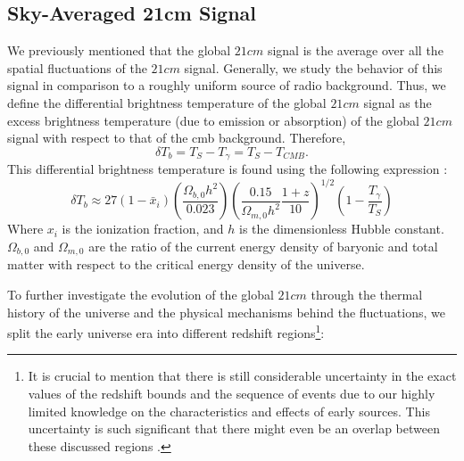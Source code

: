 \documentclass[12pt, TexShade, letterpaper]{report}
\begin{document}
\subsection{Sky-Averaged 21cm Signal}
\label{chap:global21cm,sub:physics,sub:global}
We previously mentioned that the global $21cm$ signal is the average over all the spatial fluctuations of the $21cm$ signal. Generally, we study the behavior of this signal in comparison to a roughly uniform source of radio background. Thus, we define the differential brightness temperature of the global $21cm$ signal as the excess brightness temperature (due to emission or absorption) of the global $21cm$ signal with respect to that of the \gls{cmb} background. Therefore,
\begin{equation}
    \delta T_b = T_{S} - T_{\gamma} = T_S - T_{CMB}.
\end{equation}
This differential brightness temperature is found using the following expression \cite{low_frequency}:
\begin{equation}
    \delta T_b \approx 27 \left(1- \bar{x}_i\right) \left(\frac{\Omega_{b, 0}h^2}{0.023}\right) \left( \frac{0.15}{\Omega_{m, 0}h^2} \frac{1+z}{10}\right)^{1/2}\left(1-\frac{T_\gamma}{T_S}\right)
    \label{eq:global_curve}
\end{equation}
Where $x_i$ is the ionization fraction, and $h$ is the dimensionless Hubble constant. $\Omega_{b, 0}$ and $\Omega_{m, 0}$ are the ratio of the current energy density of baryonic and total matter with respect to the critical energy density of the universe.\par
To further investigate the evolution of the global $21cm$ through the thermal history of the universe and the physical mechanisms behind the fluctuations, we split the early universe era into different redshift regions\footnote{It is crucial to mention that there is still considerable uncertainty in the exact values of the redshift bounds and the sequence of events due to our highly limited knowledge on the characteristics and effects of early sources. This uncertainty is such significant that there might even be an overlap between these discussed regions \cite{21century}.}:\par
\end{document}
